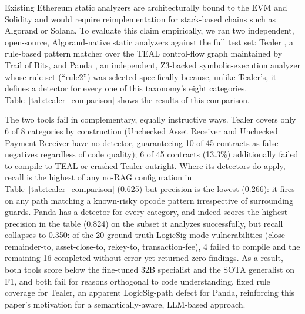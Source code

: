 \documentclass[lettersize,journal]{IEEEtran}
\begin{document}
Existing Ethereum static analyzers are architecturally bound to the
EVM and Solidity and would require reimplementation for stack-based chains such as Algorand or
Solana. To evaluate this claim empirically, we ran two independent, open-source,
Algorand-native static analyzers against the full test set: Tealer \cite{tealer}, a rule-based pattern
matcher over the TEAL control-flow graph maintained by Trail of Bits, and Panda \cite{panda}, an
independent, Z3-backed symbolic-execution analyzer whose rule set (``rule2'') was selected
specifically because, unlike Tealer's, it defines a detector for every one of this taxonomy's eight
categories.
Table~\ref{tab:tealer_comparison} shows the results of this comparison.
\begin{table}[t]
\centering
\caption{Two existing static analyzers vs.\ LLM-based baselines, Algorand, no RAG, 45-contract test
set. Tealer and Panda are deterministic (single run); LLM rows are mean $\pm$ std over 5 seeded
samples.}
\label{tab:tealer_comparison}
\end{table}
The two tools fail in complementary, equally instructive ways. Tealer covers only 6 of 8
categories by construction (Unchecked Asset Receiver and Unchecked Payment Receiver have no
detector, guaranteeing 10 of 45 contracts as false negatives regardless of code quality); 6 of 45
contracts (13.3\%) additionally failed to compile to TEAL or crashed Tealer outright. Where its
detectors do apply, recall is the highest of any no-RAG configuration in
Table~\ref{tab:tealer_comparison} (0.625) but precision is the lowest (0.266): it fires on any path
matching a known-risky opcode pattern irrespective of surrounding guards. Panda has a
detector for every category, and indeed scores the highest precision in the table (0.824) on the
subset it analyzes successfully, but recall collapses to 0.350: of the 20 ground-truth LogicSig-mode
vulnerabilities (close-remainder-to, asset-close-to, rekey-to, transaction-fee), 4 failed to compile
and the remaining 16 completed without error yet returned zero findings.
As a result, both tools score
below the fine-tuned 32B specialist and the SOTA generalist on F1, and both fail for reasons
orthogonal to code understanding, fixed rule coverage for Tealer, an apparent LogicSig-path defect
for Panda, reinforcing this paper's motivation for a semantically-aware, LLM-based approach.
\end{document}
